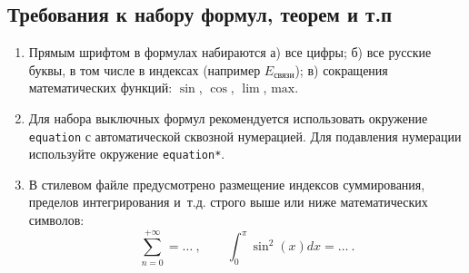\documentclass[10pt,a4paper]{book}
\begin{document}
\subsection{Требования к набору формул, теорем и т.п}
\begin{enumerate}[itemsep=0pt,parsep=2pt,topsep=2pt,partopsep=0pt]
\item Прямым шрифтом в формулах набираются а) все цифры; б) все русские буквы, в том числе
      в индексах (например $E_\text{связи}$);  в) сокращения математических функций: 
      $\sin$, $\cos$, $\lim$, $\mathrm{max}$.

\item Для набора выключных формул рекомендуется использовать окружение {\tt equation} с 
      автоматической сквозной нумерацией. Для подавления нумерации используйте окружение
      {\tt equation*}.

\pagebreak
\item В стилевом файле предусмотрено размещение индексов суммирования, пределов 
      интегрирования и~т.д. строго выше или ниже математических символов:
      \begin{equation}
        \sum_{n=0}^{+\infty}=\ldots\ , \qquad \int_{0}^{\pi}\sin^2(x) dx =\ldots\ .
      \end{equation}


\end{enumerate}
\end{document}
